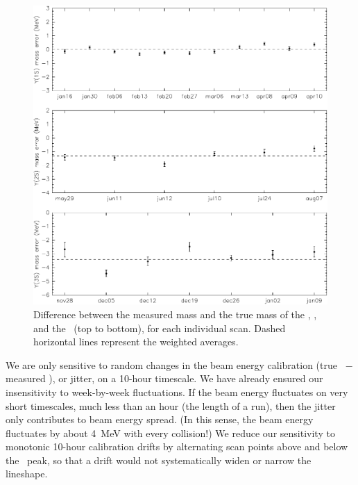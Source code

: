 \documentclass{cornell}
\begin{document}
\begin{figure}[p]
  \begin{center}
    \includegraphics[width=\linewidth]{plots/beamenergydrift}
  \end{center}
  \caption[Beam energy calibration as a function of
  date]{\label{beamenergydrift} Difference between the measured mass
  and the true mass of the \us, \uss, and the \usss\ (top to bottom),
  for each individual scan.  Dashed horizontal lines represent the
  weighted averages.}
\end{figure}

We are only sensitive to random changes in the beam energy calibration
(true \ebeam\ $-$ measured \ebeam), or jitter, on a 10-hour timescale.
We have already ensured our insensitivity to week-by-week
fluctuations.  If the beam energy fluctuates on very short timescales,
much less than an hour (the length of a run), then the jitter only
contributes to beam energy spread.  (In this sense, the beam energy
fluctuates by about 4~MeV with every collision!)  We reduce our
sensitivity to monotonic 10-hour calibration drifts by alternating
scan points above and below the \ups\ peak, so that a drift would not
systematically widen or narrow the lineshape.
\end{document}
